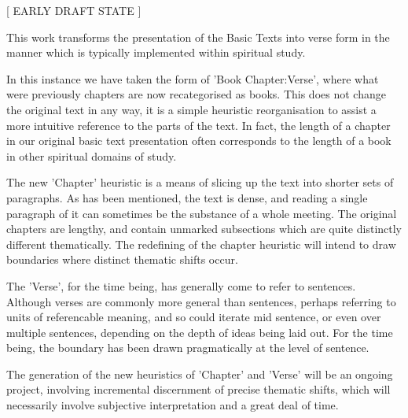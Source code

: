 \begin{fmatterchapter}


\begin{center}[ EARLY DRAFT STATE ]\end{center}

This work transforms the presentation of the Basic Texts 
    into verse form 
    in the manner which is typically implemented 
    within spiritual study.

In this instance we have taken the form of 'Book Chapter:Verse', 
    where what were previously chapters are now recategorised as books.
This does not change the original text in any way, 
    it is a simple heuristic reorganisation 
    to assist a more intuitive reference to the parts of the text.
In fact, 
    the length of a chapter in our original basic text presentation 
    often corresponds to the length of a book 
    in other spiritual domains of study.

The new 'Chapter' heuristic 
    is a means of slicing up the text into shorter sets of paragraphs.
As has been mentioned, the text is dense, 
    and reading a single paragraph of it 
    can sometimes be the substance of a whole meeting.
The original chapters are lengthy, 
    and contain unmarked subsections 
    which are quite distinctly different thematically.
The redefining of the chapter heuristic 
    will intend to draw boundaries where distinct thematic shifts occur.

The 'Verse', for the time being, has generally come to refer to sentences.
Although verses are commonly more general than sentences, 
    perhaps referring to units of referencable meaning, 
    and so could iterate mid sentence, 
    or even over multiple sentences, 
    depending on the depth of ideas being laid out.
For the time being, 
    the boundary has been drawn pragmatically at the level of sentence.

The generation of the new heuristics of 'Chapter' and 'Verse' 
    will be an ongoing project,
    involving incremental discernment of precise thematic shifts,
    which will necessarily involve subjective interpretation
    and a great deal of time.


\end{fmatterchapter}
